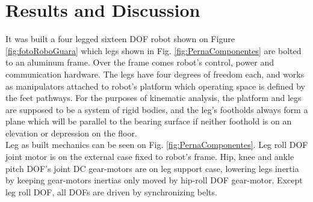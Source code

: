 \section{Results and Discussion}
It was built a four legged sixteen DOF robot shown on Figure \ref{fig:fotoRoboGuara} which legs shown in Fig. \ref{fig:PernaComponentes} are bolted to an aluminum frame. Over the frame comes robot's control, power and communication hardware. The legs have four degrees of freedom each, and works as manipulators  attached to robot's platform which operating space is defined by the feet pathways. For the purposes of kinematic analysis, the platform and legs are supposed to be a system of rigid bodies, and the leg's footholds always form a plane which will be parallel to the bearing surface if neither foothold is on an elevation or depression on the floor. \\
Leg as built mechanics can be seen on Fig. \ref{fig:PernaComponentes}. Leg roll DOF joint motor is on the external case fixed to robot's frame. Hip, knee and ankle pitch DOF's joint DC gear-motors are on leg support case, lowering legs inertia by keeping gear-motors inertias only moved by hip-roll DOF gear-motor. Except leg roll DOF, all DOFs are driven by synchronizing belts. 
